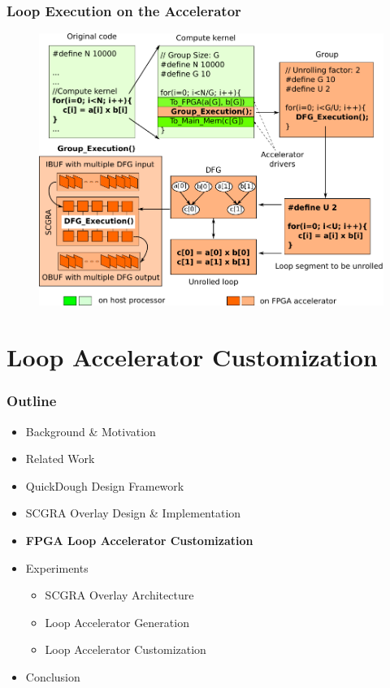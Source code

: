 \documentclass[accentcolor=tud1a,colorbacktitle,inverttitle,landscape,german,presentation,t]{tudbeamer}
\begin{document}
  \begin{frame}
  \frametitle{Loop Execution on the Accelerator}
  \begin{figure}
    \includegraphics[width=.75\linewidth]{dfg-gen}
  \end{figure}
  \end{frame}

\section{Loop Accelerator Customization}
  \begin{frame}
  \frametitle{Outline}
  \begin{itemize}
  \setlength{\itemsep}{6pt}
  \item Background \& Motivation
  \item Related Work
  \item QuickDough Design Framework
  \item SCGRA Overlay Design \& Implementation
  \item \textbf{FPGA Loop Accelerator Customization}
  \item Experiments
  \begin{itemize}
    \setlength{\itemsep}{6pt}
    \item SCGRA Overlay Architecture
    \item Loop Accelerator Generation
    \item Loop Accelerator Customization
  \end{itemize}
  \item Conclusion
  \end{itemize}
  \end{frame}
\end{document}
